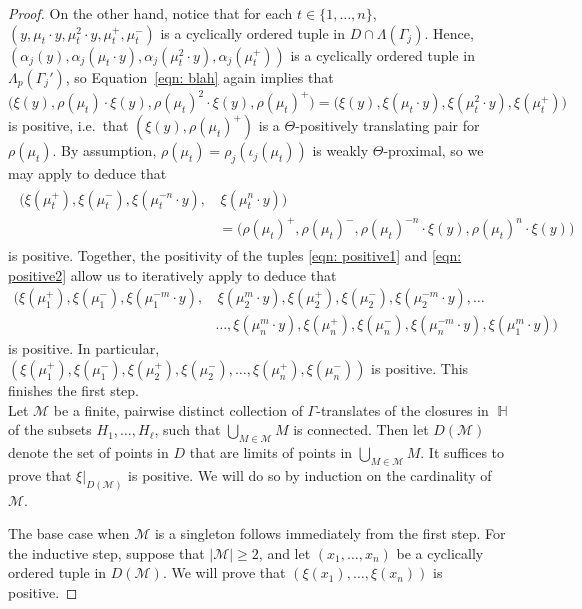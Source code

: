 \documentclass{amsart}
\theoremstyle{plain}
\theoremstyle{definition}
\DeclareMathOperator{\Hb}{\mathbb{H}}
\newcommand{\abs}[1]{\left|#1\right|}
\newcommand{\1}{\mathbf{1}}
\begin{document}
\begin{proof}
On the other hand, notice that for each $t\in\{1,\dots,n\}$, $(y,\mu_t\cdot y,\mu_t^2\cdot y,\mu_t^+,\mu_t^-)$ is a cyclically ordered tuple in $D\cap \Lambda(\Gamma_j)$. Hence, $(\alpha_j(y),\alpha_j(\mu_t\cdot y),\alpha_j(\mu_t^2\cdot y),\alpha_j(\mu_t^+))$ is a cyclically ordered tuple in $\Lambda_p(\Gamma_j')$, so Equation~\eqref{eqn: blah} again implies that
\[\big(\xi(y),\rho(\mu_t)\cdot\xi(y),\rho(\mu_t)^2\cdot\xi( y),\rho(\mu_t)^+\big)=\big(\xi(y),\xi(\mu_t\cdot y),\xi(\mu_t^2\cdot y),\xi(\mu_t^+)\big)\]
is positive, i.e.\ that $(\xi(y),\rho(\mu_t)^+)$ is a $\Theta$-positively translating pair for $\rho(\mu_t)$. By assumption, $\rho(\mu_t)=\rho_j(\iota_j(\mu_t))$ is weakly $\Theta$-proximal, so we may apply  to deduce that 
\begin{align}\label{eqn: positive2}
\begin{split}
\big(\xi(\mu_t^+),\xi(\mu_t^-), \xi(\mu_t^{-n}\cdot y),&\,\xi(\mu_t^n\cdot y)\big)\\
&=\big(\rho(\mu_t)^+,\rho(\mu_t)^-,\rho(\mu_t)^{-n}\cdot \xi(y),\rho(\mu_t)^n\cdot\xi(y)\big)
\end{split}
\end{align}
    is positive. Together, the positivity of the tuples \eqref{eqn: positive1} and \eqref{eqn: positive2} allow us to iteratively apply  to deduce that 
\begin{align*}
\big(\xi(\mu_1^+),\xi(\mu_1^-),\xi(\mu_1^{-m}\cdot y),&\,\xi(\mu_2^m\cdot y),\xi(\mu_2^+),\xi(\mu_2^-),\xi(\mu_2^{-m}\cdot y),\dots\\
&\dots,\xi(\mu_n^m\cdot y),\xi(\mu_n^+),\xi(\mu_n^-),\xi(\mu_n^{-m}\cdot y),\xi(\mu_1^m\cdot y)\big)    
\end{align*}
is positive. In particular, $\left(\xi(\mu_1^+),\xi(\mu_1^-),\xi(\mu_2^+),\xi(\mu_2^-),\dots,\xi(\mu_n^+),\xi(\mu_n^-)\right)$ is positive. This finishes the first step.\\

 Let $\mathcal M$ be a finite, pairwise distinct collection of $\Gamma$-translates of the closures in $\Hb$ of the subsets $H_1,\dots,H_\ell$, such that $\bigcup_{M\in\mathcal M}M$ is connected. Then let $D(\mathcal M)$ denote the set of points in $D$ that are limits of points in $\bigcup_{M\in\mathcal M}M$. It suffices to prove that $\xi|_{D(\mathcal M)}$ is positive. We will do so by induction on the cardinality of $\mathcal M$. 

The base case when $\mathcal M$ is a singleton follows immediately from the first step. For the inductive step, suppose that $\abs{\mathcal M}\ge 2$, and let $(x_1,\dots,x_n)$ be a cyclically ordered tuple in $D(\mathcal M)$. We will prove that $(\xi(x_1),\dots,\xi(x_n))$ is positive.


\end{proof}
\end{document}
